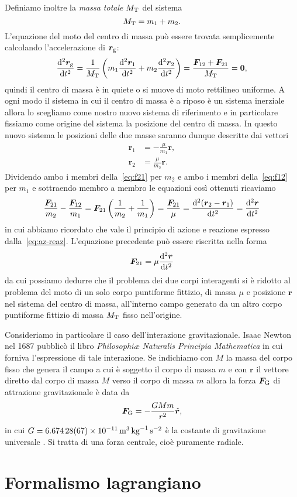 Definiamo inoltre la \emph{massa totale} $M_\textup{T}$ del sistema
\begin{equation}
  M_\textup{T}=m_1+m_2.
\end{equation}
L'equazione del moto del centro di massa può essere trovata semplicemente
calcolando l'accelerazione di $\bm{r}_\textup{g}$:
\begin{equation}
  \toder[2]{\bm{r}_\textup{g}}{t} = \frac{1}{M_\textup{T}}
  \left(
    m_1\toder[2]{\bm{r}_1}{t} + m_2\toder[2]{\bm{r}_2}{t}
  \right) = \frac{\bm{F}_{12}+\bm{F}_{21}}{M_\textup{T}} = \bm{0},
\end{equation}
quindi il centro di massa è in quiete o si muove di moto rettilineo uniforme. A
ogni modo il sistema in cui il centro di massa è a riposo è un sistema inerziale
allora lo scegliamo come nostro nuovo sistema di riferimento e in particolare
fissiamo come origine del sistema la posizione del centro di massa. In questo
nuovo sistema le posizioni delle due masse saranno dunque descritte dai vettori
\begin{align}
  \bm{r}_1 &= -\frac{\mu}{m_1}\bm{r},\\
  \bm{r}_2 &= \frac{\mu}{m_2}\bm{r}.
\end{align}
Dividendo ambo i membri della~\eqref{eq:f21} per $m_2$ e ambo i membri
della~\eqref{eq:f12} per $m_1$ e sottraendo membro a membro le equazioni così
ottenuti ricaviamo
\begin{equation}
  \frac{\bm{F}_{21}}{m_2}-\frac{\bm{F}_{12}}{m_1} = \bm{F}_{21}
  \left(
    \frac{1}{m_2}+\frac{1}{m_1}
  \right) = \frac{\bm{F}_{21}}{\mu} = \toder[2]{(\bm{r}_2-\bm{r}_1)}{t} = \toder[2]{\bm{r}}{t}
\end{equation}
in cui abbiamo ricordato che vale il principio di azione e reazione espresso
dalla~\eqref{eq:az-reaz}. L'equazione precedente può essere riscritta nella forma
\begin{equation}
  \bm{F}_{21}=\mu\toder[2]{\bm{r}}{t}  
\end{equation}
da cui possiamo dedurre che il problema dei due corpi interagenti si è ridotto
al problema del moto di un solo corpo puntiforme fittizio, di massa $\mu$ e
posizione $\bm{r}$ nel sistema del centro di massa, all'interno campo generato
da un altro corpo puntiforme fittizio di massa $M_\textup{T}$ fisso
nell'origine.

Consideriamo in particolare il caso dell'interazione gravitazionale. Isaac
Newton nel 1687 pubblicò il libro \emph{Philosophiæ Naturalis Principia
  Mathematica} in cui forniva l'espressione di tale interazione. Se indichiamo
con $M$ la massa del corpo fisso che genera il campo a cui è soggetto il corpo
di massa $m$ e con $\bm{r}$ il vettore diretto dal corpo di massa $M$ verso il
corpo di massa $m$ allora la forza $\bm{F}_\textup{G}$ di attrazione
gravitazionale è data da
\begin{equation}
  \bm{F}_\textup{G} = -\frac{GMm}{r^2}\versor{r},
\end{equation}
in cui $G=\SI{6.674
  28(67)e-11}{\metre\tothe{3}\per\kilogram\per\second\squared}$ è la costante di
gravitazione universale \cite{codata-costanti}. Si tratta di una forza centrale,
cioè puramente radiale.


\section{Formalismo lagrangiano}
\label{sec:formalismo-lagrange}

